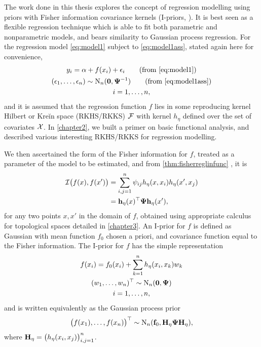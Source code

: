 \documentclass[11pt,twoside,openright]{report}
\begin{document}
\thispagestyle{chapterseven}

The work done in this thesis explores the concept of regression modelling using priors with Fisher information covariance kernels (I-priors, \cite{bergsma2017}).
It is best seen as a flexible regression technique which is able to fit both parametric and nonparametric models, and bears similarity to Gaussian process regression.
For the regression model \cref{eq:model1} subject to \cref{eq:model1ass}, stated again here for convenience,
\begin{gather}
  y_i = \alpha + f(x_i) + \epsilon_i \tag{from \ref{eq:model1}} \\
  (\epsilon_1,\dots,\epsilon_n) \sim \N_n(\bzero,\bPsi^{-1}) \tag{from \ref{eq:model1ass}} \\
  i = 1,\dots,n, \nonumber
\end{gather}
and it is assumed that the regression function $f$ lies in some reproducing kernel Hilbert or Kreĭn space (RKHS/RKKS) ${\mathcal F}$ with kernel $h_\eta$ defined over the set of covariates ${\mathcal X}$.
In \cref{chapter2}, we built a primer on basic functional analysis, and described various interesting RKHS/RKKS for regression modelling.

We then ascertained the form of the Fisher information for $f$, treated as a parameter of the model to be estimated, and from \cref{thm:fisherreglinfunc} , it is
\begin{align*}
  {\mathcal I}\big(f(x),f(x') \big) 
  &= \sum_{i,j=1}^n \psi_{ij} h_\eta(x,x_i) h_\eta(x',x_j) \\
  &= {\mathbf h}_\eta(x)^\top{\bm\Psi}{\mathbf h}_\eta(x'), 
\end{align*}
for any two points $x,x'$ in the domain of $f$, obtained using appropriate calculus for topological spaces detailed in \cref{chapter3}.
An I-prior for $f$ is defined as Gaussian with mean function $f_0$ chosen a priori, and covariance function equal to the Fisher information.
The I-prior for $f$ has the simple representation
\begin{gather*}
  f(x_i) = f_0(x_i) + \sum_{k=1}^n h_\eta(x_i,x_k)w_k \\
  (w_1,\dots,w_n)^\top \sim \operatorname{N}_n({\mathbf 0},{\bm\Psi}) \\
  i=1,\dots,n,
\end{gather*}
and is written equivalently as the Gaussian process prior
\begin{equation*}
  \big(f(x_1),\dots,f(x_n) \big)^\top \sim \operatorname{N}_n({\mathbf f}_0, {\mathbf H}_\eta{\bm\Psi}{\mathbf H}_\eta),
\end{equation*}
where ${\mathbf H}_\eta=\big( h_\eta(x_i,x_j) \big)_{i,j=1}^n$.
\end{document}

